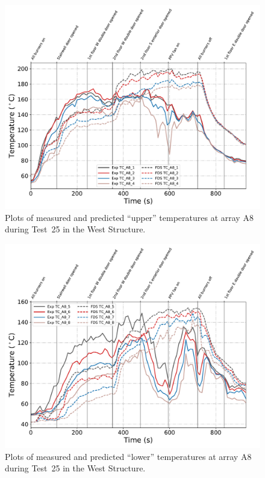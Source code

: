 \begin{figure}[!h]
	\centering
	\includegraphics[width=\columnwidth]{Figures/Plots/Validation/Temperature/Test_25_TC_A8_upper}
	\caption{Plots of measured and predicted ``upper'' temperatures at array A8 during Test~25 in the West Structure.}
	\label{fig:TCA8_upper_data_Test25}
\end{figure}
\begin{figure}[!h]
	\centering
	\includegraphics[width=\columnwidth]{Figures/Plots/Validation/Temperature/Test_25_TC_A8_lower}
	\caption{Plots of measured and predicted ``lower'' temperatures at array A8 during Test~25 in the West Structure.}
	\label{fig:TCA8_lower_data_Test25}
\end{figure}

